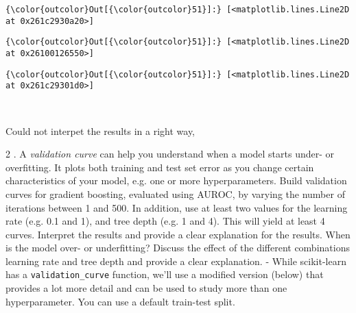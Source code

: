 \documentclass[11pt]{article}
\begin{document}
\begin{Verbatim}[commandchars=\\\{\}]
{\color{outcolor}Out[{\color{outcolor}51}]:} [<matplotlib.lines.Line2D at 0x261c2930a20>]
\end{Verbatim}
            
\begin{Verbatim}[commandchars=\\\{\}]
{\color{outcolor}Out[{\color{outcolor}51}]:} [<matplotlib.lines.Line2D at 0x26100126550>]
\end{Verbatim}
            
\begin{Verbatim}[commandchars=\\\{\}]
{\color{outcolor}Out[{\color{outcolor}51}]:} [<matplotlib.lines.Line2D at 0x261c29301d0>]
\end{Verbatim}
            
    \begin{center}
    \end{center}
    { \hspace*{\fill} \\}
    
    Could not interpet the results in a right way,

    2 . A \emph{validation curve} can help you understand when a model
starts under- or overfitting. It plots both training and test set error
as you change certain characteristics of your model, e.g. one or more
hyperparameters. Build validation curves for gradient boosting,
evaluated using AUROC, by varying the number of iterations between 1 and
500. In addition, use at least two values for the learning rate (e.g.
0.1 and 1), and tree depth (e.g. 1 and 4). This will yield at least 4
curves. Interpret the results and provide a clear explanation for the
results. When is the model over- or underfitting? Discuss the effect of
the different combinations learning rate and tree depth and provide a
clear explanation. - While scikit-learn has a \texttt{validation\_curve}
function, we'll use a modified version (below) that provides a lot more
detail and can be used to study more than one hyperparameter. You can
use a default train-test split.
\end{document}
